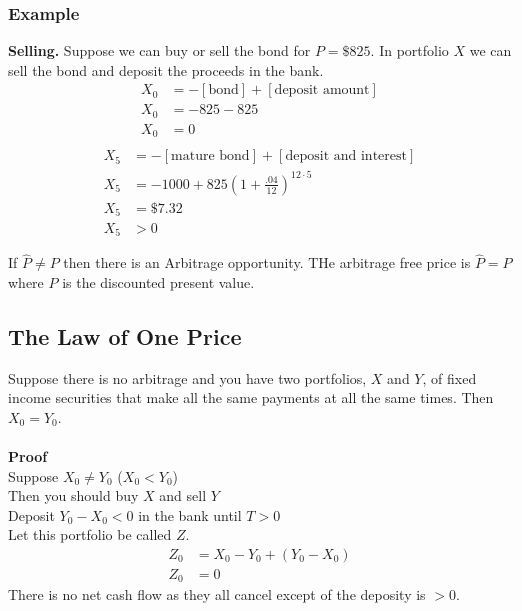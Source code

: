 \documentclass[12pt,letterpaper, twocolumn]{article}
\begin{document}
\subsubsection*{Example}
\textbf{Selling.} 
Suppose we can buy or sell the bond for $P=\$825$. In portfolio $X$ we can sell the bond and deposit the proceeds in the bank. 
\begin{align*}
    X_0 &= -[\text{bond}] + [\text{deposit amount}]\\
    X_0 &= -825-825\\
    X_0 &= 0\\
\end{align*}
\begin{align*}
    X_5 &= -[\text{mature bond}] + [\text{deposit and interest}]\\
    X_5 &= -1000+825(1+\frac{.04}{12})^{12\cdot5}\\
    X_5 &= \$7.32\\
    X_5 &> 0
\end{align*}

If $\hat{P} \neq P$ then there is an Arbitrage opportunity. THe arbitrage free price is $\hat{P} = P$ where $P$ is the discounted present value. 

\subsection{The Law of One Price}
Suppose there is no arbitrage and you have two portfolios, $X$ and $Y$, of fixed income securities that make all the same payments at all the same times. Then $X_0 = Y_0$.
\\\\\textbf{Proof}\\
Suppose $X_0 \neq Y_0$ ($X_0 < Y_0$)\\
Then you should buy $X$ and sell $Y$\\
Deposit $Y_0 - X_0 <0$ in the bank until $T>0$\\
Let this portfolio be called $Z$. \\
\begin{align*}
    Z_0 &= X_0 - Y_0 + (Y_0 - X_0)\\
    Z_0 &= 0
\end{align*}
There is no net cash flow as they all cancel except of the deposity is $>0$. 
\end{document}
